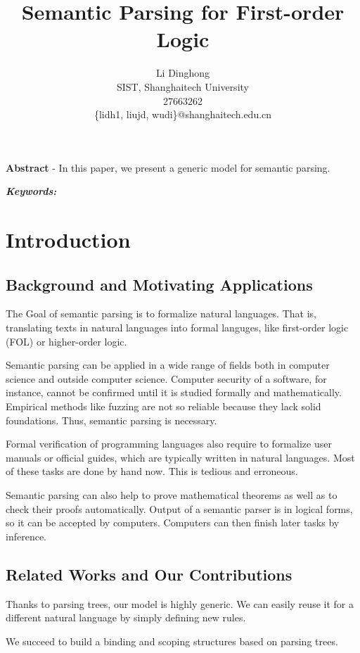 \documentclass{article}
\title{Semantic Parsing for First-order Logic}
\author{
	Li Dinghong\\
	SIST, Shanghaitech University\\
	27663262\\
	\{lidh1, liujd, wudi\}@shanghaitech.edu.cn
}
\begin{document}
{
	\newpage
	\maketitle

	\textbf{Abstract} - {In this paper, we present a generic model for semantic parsing. }

	\vspace{5pt}
	\textbf{\emph{Keywords:}} {}

	\tableofcontents
}

\section{Introduction}{
	\subsection{Background and Motivating Applications}{
		The Goal of semantic parsing is to formalize natural languages. That is, translating texts in natural languages into formal languges, like first-order logic (FOL) or higher-order logic. 

		Semantic parsing can be applied in a wide range of fields both in computer science and outside computer science. Computer security of a software, for instance, cannot be confirmed until it is studied formally and mathematically. Empirical methods like fuzzing are not so reliable because they lack solid foundations. Thus, semantic parsing is necessary. 

		Formal verification of programming languages also require to formalize user manuals or official guides, which are typically written in natural languages. Most of these tasks are done by hand now. This is tedious and erroneous. 

		Semantic parsing can also help to prove mathematical theorems as well as to check their proofs automatically. Output of a semantic parser is in logical forms, so it can be accepted by computers. Computers can then finish later tasks by inference. 
	}

	\subsection{Related Works and Our Contributions}{
		Thanks to parsing trees, our model is highly generic. We can easily reuse it for a different natural language by simply defining new rules. 

		We succeed to build a binding and scoping structures based on parsing trees. 
	}
}
\end{document}
